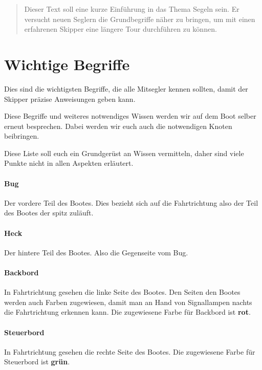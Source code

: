 \documentclass[12pt]{article}
\begin{document}
\maketitle

\begin{abstract}
Dieser Text soll eine kurze Einführung in das Thema Segeln sein. Er versucht neuen Seglern die Grundbegriffe näher zu bringen, um mit einen erfahrenen Skipper eine längere Tour durchführen zu können.
\end{abstract}

\section{Wichtige Begriffe}
Dies sind die wichtigsten Begriffe, die alle Mitsegler kennen sollten, damit der Skipper präzise Anweisungen geben kann.

Diese Begriffe und weiteres notwendiges Wissen werden wir auf dem Boot selber erneut besprechen. Dabei werden wir euch auch die notwendigen Knoten beibringen.

Diese Liste soll euch ein Grundgerüst an Wissen vermitteln, daher sind viele Punkte nicht in allen Aspekten erläutert.

\paragraph{Bug}
Der vordere Teil des Bootes. Dies bezieht sich auf die Fahrtrichtung also der Teil des Bootes der spitz zuläuft.

\paragraph{Heck}
Der hintere Teil des Bootes. Also die Gegenseite vom Bug.

\paragraph{Backbord}
In Fahrtrichtung gesehen die linke Seite des Bootes. Den Seiten den Bootes werden auch Farben zugewiesen, damit man an Hand von Signallampen nachts die Fahrtrichtung erkennen kann. Die zugewiesene Farbe für Backbord ist \textbf{rot}.

\paragraph{Steuerbord}
In Fahrtrichtung gesehen die rechte Seite des Bootes. Die zugewiesene Farbe für Steuerbord ist \textbf{grün}.
\end{document}
